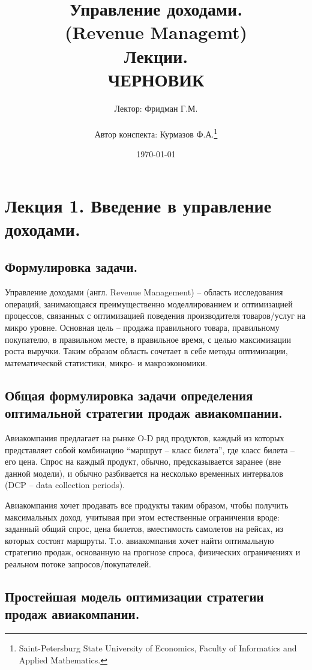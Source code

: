 \documentclass[reqno]{article}
\title{Управление доходами.\\ (Revenue Managemt)\\ Лекции.\\ ЧЕРНОВИК}
\author{Лектор: Фридман Г.М.\\  \\ Автор конспекта: Курмазов Ф.А.\thanks{Saint-Petersburg State University of Economics, Faculty of Informatics and Applied Mathematics.}}
\date{\today}
\theoremstyle{definition}
\theoremstyle{definition}
\theoremstyle{definition}
\theoremstyle{definition}
\theoremstyle{definition}
\theoremstyle{definition}
\theoremstyle{definition}
\theoremstyle{definition}
\theoremstyle{definition}
\begin{document}
	\maketitle

	\tableofcontents


	\newpage
	\section{Лекция 1. Введение в управление доходами.}
		\subsection{Формулировка задачи.}
			
		Управление доходами (англ. Revenue Management) -- область исследования операций, занимающаяся преимущественно моделлированием и оптимизацией процессов, связанных с оптимизацией поведения производителя товаров/услуг на микро уровне. Основная цель -- продажа правильного товара, правильному покупателю, в правильном месте, в правильное время, с целью максимизации роста выручки. Таким образом область сочетает в себе методы оптимизации, математической статистики, микро- и макроэкономики.
		
		\subsection{Общая формулировка задачи определения оптимальной стратегии продаж авиакомпании.}
			Авиакомпания предлагает на рынке O-D ряд продуктов, каждый из которых представляет собой комбинацию ``маршрут -- класс билета'', где класс билета -- его цена. Спрос на каждый продукт, обычно, предсказывается заранее (вне данной модели), и обычно разбивается на несколько временных интервалов (DCP -- data collection periods).
			
			Авиакомпания хочет продавать все продукты таким образом, чтобы получить максимальных доход, учитывая при этом естественные ограничения вроде: заданный общий спрос, цена билетов, вместимость самолетов на рейсах, из которых состоят маршруты. Т.о. авиакомпания хочет найти оптимальную стратегию продаж, основанную на прогнозе спроса, физических ограничениях и реальном потоке запросов/покупателей.
		
		\subsection{Простейшая модель оптимизации стратегии продаж авиакомпании.}
	
\end{document}
